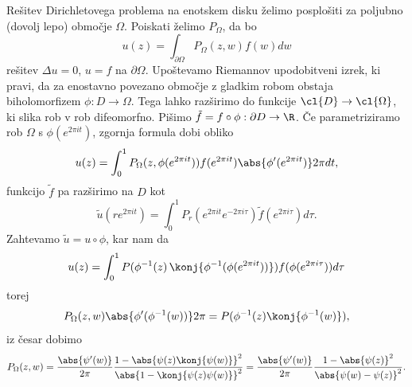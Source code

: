 
Rešitev Dirichletovega problema na enotskem disku želimo posplošiti za poljubno
(dovolj lepo) območje $\Omega$.
Poiskati želimo $P_\Omega$, da bo
\[
  u(z) = \int_{\partial \Omega} P_\Omega(z, w) f(w) dw
\]
rešitev $\Delta u = 0$, $u = f$ na $\partial \Omega$.
Upoštevamo Riemannov upodobitveni izrek, ki pravi, da za enostavno povezano
območje z gladkim robom obstaja biholomorfizem $\phi: D \to \Omega$.
Tega lahko razširimo do funkcije $\cl{D} \to \cl{\Omega}$, ki slika rob v rob
difeomorfno.
Pišimo $\tilde{f} = f \circ \phi: \partial D \to \R$.
Če parametriziramo rob $\Omega$ s $\phi(e^{2 \pi i t})$, zgornja formula dobi
obliko
\[
  u(z) = \int_0^1 P_\Omega(z, \phi(e^{2 \pi i t})) f(e^{2 \pi i t})
  \abs{\phi'(e^{2 \pi i t})} 2 \pi dt,
\]
funkcijo $\tilde{f}$ pa razširimo na $D$ kot
\[
  \tilde{u}(r e^{2 \pi i t}) = \int_0^1 P_r(e^{2 \pi i t} e^{-2 \pi i \tau})
  \tilde{f}(e^{2 \pi i \tau}) d\tau.
\]
Zahtevamo $\tilde{u} = u \circ \phi$, kar nam da
\[
  u(z) = \int_0^1 P(\phi^{-1}(z)\,\konj{\phi^{-1}(\phi(e^{2 \pi i t}))})
  f(\phi(e^{2 \pi i \tau})) d\tau
\]
torej
\[
  P_\Omega(z,w) \abs{\phi'(\phi^{-1}(w))} 2 \pi = P(\phi^{-1}(z)
  \konj{\phi^{-1}(w)}),
\]
iz česar dobimo
\[
  P_\Omega(z,w) = \frac{\abs{\psi'(w)}}{2 \pi} \frac{1 - \abs{\psi(z)
	  \konj{\psi(w)}}^2}{\abs{1 - \konj{\psi(z) \psi(w)}}^2}
  = \frac{\abs{\psi'(w)}}{2 \pi}
  \frac{1 - \abs{\psi(z)}^2}{\abs{\psi(w) - \psi(z)}^2}.
\]


